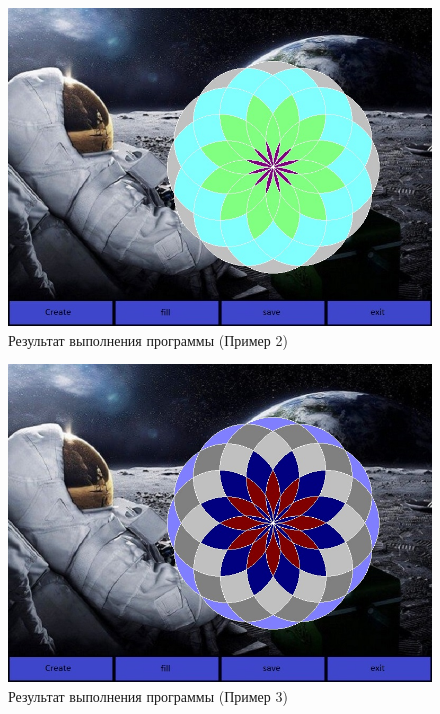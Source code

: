 \documentclass[14pt, a4paper]{extreport}
\begin{document}
\begin{figure}[h!]
	\centering
	\includegraphics[width = 12cm]{image/output2}
  \caption{Результат выполнения программы (Пример 2)}
\end{figure}

\begin{figure}[h!]
	\centering
	\includegraphics[width = 12cm]{image/output3}
  \caption{Результат выполнения программы (Пример 3)}
\end{figure}

\end{document}
